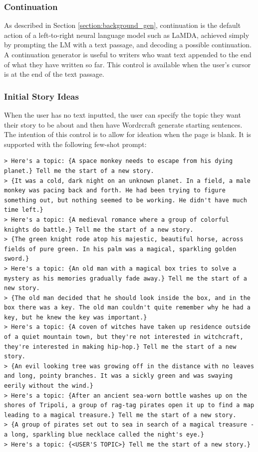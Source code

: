 \subsubsection{Continuation}
As described in Section \ref{section:background_gen}, continuation is the default action of a left-to-right neural language model such as LaMDA, achieved simply by prompting the LM with a text passage, and decoding a possible continuation.
A continuation generator is useful to writers who want text appended to the end of what they have written so far.
This control is available when the user's cursor is at the end of the text passage.

\subsubsection{Initial Story Ideas}
When the user has no text inputted, the user can specify the topic they want their story to be about and then have Wordrcraft generate starting sentences.
The intention of this control is to allow for ideation when the page is blank.
It is supported with the following few-shot prompt:

\begin{lstlisting}
> Here's a topic: {A space monkey needs to escape from his dying planet.} Tell me the start of a new story.
> {It was a cold, dark night on an unknown planet. In a field, a male monkey was pacing back and forth. He had been trying to figure something out, but nothing seemed to be working. He didn't have much time left.}
> Here's a topic: {A medieval romance where a group of colorful knights do battle.} Tell me the start of a new story.
> {The green knight rode atop his majestic, beautiful horse, across fields of pure green. In his palm was a magical, sparkling golden sword.}
> Here's a topic: {An old man with a magical box tries to solve a mystery as his memories gradually fade away.} Tell me the start of a new story.
> {The old man decided that he should look inside the box, and in the box there was a key. The old man couldn't quite remember why he had a key, but he knew the key was important.}
> Here's a topic: {A coven of witches have taken up residence outside of a quiet mountain town, but they're not interested in witchcraft, they're interested in making hip-hop.} Tell me the start of a new story.
> {An evil looking tree was growing off in the distance with no leaves and long, pointy branches. It was a sickly green and was swaying eerily without the wind.}
> Here's a topic: {After an ancient sea-worn bottle washes up on the shores of Tripoli, a group of rag-tag pirates open it up to find a map leading to a magical treasure.} Tell me the start of a new story.
> {A group of pirates set out to sea in search of a magical treasure - a long, sparkling blue necklace called the night's eye.}
> Here's a topic: {<USER'S TOPIC>} Tell me the start of a new story.}
\end{lstlisting}

